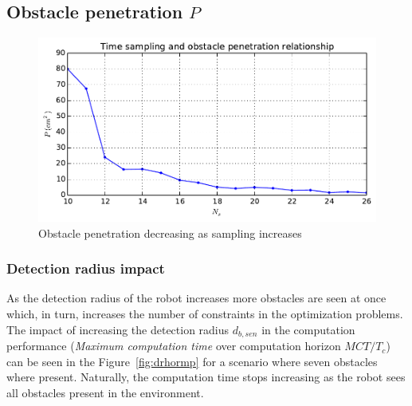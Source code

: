 \documentclass[eprint]{actapoly}
\begin{document}

\subsection{Obstacle penetration $P$}

\begin{figure}[!h]\centering
  \includegraphics[width=\linewidth]{./images/penetration/pen-nsi.pdf} %
  \caption{Obstacle penetration decreasing as sampling increases}
\label{fig:res}
\end{figure}

\subsubsection{Detection radius impact}

As the detection radius of the robot increases more obstacles are
seen at once which, in turn,
increases the number of constraints in the optimization problems.
The impact of increasing the detection radius $d_{b,sen}$ in the computation
performance (\textit{Maximum computation time} over computation horizon $MCT/T_c$) can
be seen in the Figure~\ref{fig:drhormp} for a scenario where seven obstacles where present.
Naturally, the computation time stops increasing as the robot sees all obstacles present
in the environment.
\end{document}
